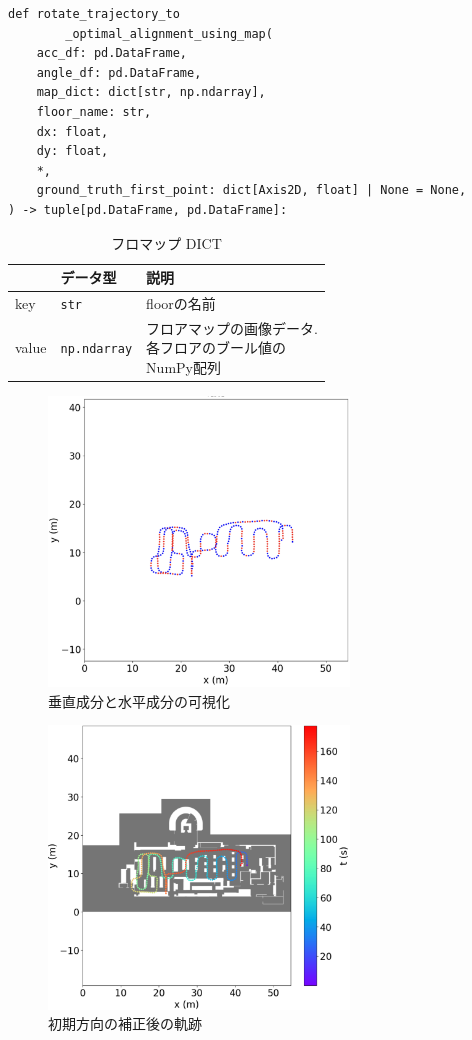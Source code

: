 \begin{lstlisting}[caption={初期方向補正}, label=lst:pdr-rotate]
def rotate_trajectory_to
		_optimal_alignment_using_map(
    acc_df: pd.DataFrame,
    angle_df: pd.DataFrame,
    map_dict: dict[str, np.ndarray],
    floor_name: str,
    dx: float,
    dy: float,
    *,
    ground_truth_first_point: dict[Axis2D, float] | None = None,
) -> tuple[pd.DataFrame, pd.DataFrame]:
\end{lstlisting}

\begin{table}[ht]
	\centering
	\begin{tabular}{lll}
		\hline
		      & \textbf{データ型}       & \textbf{説明}             \\ \hline
		key   & \texttt{str}        & floorの名前                \\ \hline
		value & \texttt{np.ndarray} & \makecell{フロアマップの画像データ. \\各フロアのブール値の\\NumPy配列} \\ \hline
	\end{tabular}
	\caption{フロマップ DICT}
	\label{tab:map_dict}
\end{table}

\begin{figure}[h]
	\centering
	\includegraphics[width=80mm]{image/rb.jpg}
	\caption{垂直成分と水平成分の可視化}    \label{fig:color}
\end{figure}

\begin{figure}[h]
	\centering
	\includegraphics[width=80mm]{image/pdr-rotate.jpg}
	\caption{初期方向の補正後の軌跡}    \label{fig:pdr-rotate}
\end{figure}


